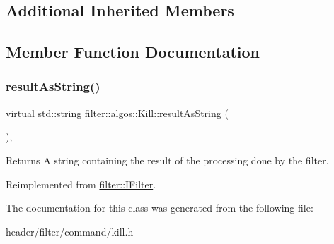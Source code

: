 \subsection*{Additional Inherited Members}


\subsection{Member Function Documentation}
\mbox{\label{classfilter_1_1algos_1_1_kill_af12b57f54905370350c6a7f291f99a6c}} 
\subsubsection{\texorpdfstring{result\+As\+String()}{resultAsString()}}
{\footnotesize\ttfamily virtual std\+::string filter\+::algos\+::\+Kill\+::result\+As\+String (\begin{DoxyParamCaption}{ }\end{DoxyParamCaption})\hspace{0.3cm}{\ttfamily [inline]}, {\ttfamily [virtual]}}

\begin{DoxyReturn}{Returns}
A string containing the result of the processing done by the filter. 
\end{DoxyReturn}


Reimplemented from \hyperlink{classfilter_1_1_i_filter_ab99902b060a6d9edc3452a8c9f85e37e}{filter\+::\+I\+Filter}.



The documentation for this class was generated from the following file\+:\begin{DoxyCompactItemize}
\item 
header/filter/command/kill.\+h\end{DoxyCompactItemize}
